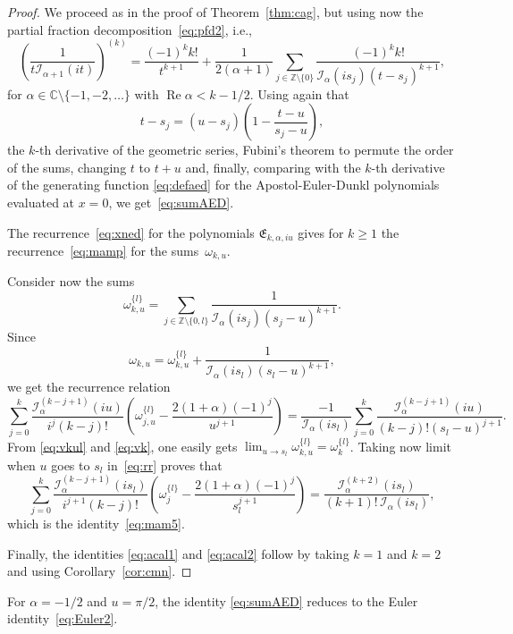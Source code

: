 \documentclass[10pt,a4paper]{article}
\theoremstyle{plain}
\theoremstyle{definition}
\numberwithin{equation}{section} %
\newcommand{\I}{\mathcal{I}}
\newcommand{\E}{\mathfrak{E}}
\newcommand{\ZZ}{\mathbb{Z}}
\newcommand{\CC}{\mathbb{C}}
\newcommand{\ZZO}{\mathbb{Z} \setminus \{0\}}
\renewcommand{\Re}{\operatorname{Re}}
\begin{document}
\begin{proof}
We proceed as in the proof of Theorem~\ref{thm:cag}, but using now the partial fraction decomposition~\eqref{eq:pfd2}, i.e.,
\begin{equation*}
  \left(\frac{1}{t\I_{\alpha+1}(it)}\right)^{(k)}
  = \frac{(-1)^kk!}{t^{k+1}} + \frac{1}{2(\alpha+1)} \sum_{j\in\ZZO}
  \frac{(-1)^kk!}{\I_\alpha(is_j)(t-s_j)^{k+1}},
\end{equation*}
for $\alpha\in \CC\setminus\{-1,-2,\dots\}$ with $\Re \alpha < k-1/2$.
Using again that
\[
  t-s_j = (u-s_j)\left(1-\frac{t-u}{s_j-u}\right),
\]
the $k$-th derivative of the geometric series, Fubini's theorem to permute the order of the sums, changing $t$ to $t+u$ and, finally, comparing with the $k$-th derivative of the generating function \eqref{eq:defaed} for the Apostol-Euler-Dunkl polynomials evaluated at $x=0$, we get~\eqref{eq:sumAED}.

The recurrence~\eqref{eq:xned} for the polynomials $\E_{k,\alpha,iu}$ gives for $k\ge 1$ the recurrence~\eqref{eq:mamp} for the sums~$\omega_{k,u}$.

Consider now the sums
\begin{equation}
\label{eq:vkul}
  \omega_{k,u}^{\{l\}} = \sum_{j\in \ZZ\setminus \{0,l\}} \frac{1}{\I_\alpha(is_j)(s_j-u)^{k+1}}.
\end{equation}
Since
\[
  \omega_{k,u} = \omega_{k,u}^{\{l\}} + \frac{1}{\I_\alpha(is_l)(s_l-u)^{k+1}},
\]
we get the recurrence relation
\begin{equation}
\label{eq:rr}
  \sum_{j=0}^k \frac{\I_\alpha^{(k-j+1)}(iu)}{i^j(k-j)!}
  \left(\omega_{j,u}^{\{l\}}-\frac{2(1+\alpha)(-1)^j}{u^{j+1}}\right)
  = \frac{-1}{\I_\alpha(is_l)} \sum_{j=0}^k \frac{\I_\alpha^{(k-j+1)}(iu)}{(k-j)!(s_l-u)^{j+1}}.
\end{equation}
From \eqref{eq:vkul} and \eqref{eq:vk}, one easily gets $\lim_{u\to s_l} \omega_{k,u}^{\{l\}} = \omega_k^{\{l\}}$.
Taking now limit when $u$ goes to $s_l$ in~\eqref{eq:rr} proves that
\[
  \sum_{j=0}^k \frac{\I_\alpha^{(k-j+1)}(is_l)}{i^{j+1}(k-j)!}
  \left(\omega_j^{\{l\}}-\frac{2(1+\alpha)(-1)^j}{s_l^{j+1}}\right)
  = \frac{\I_\alpha^{(k+2)}(is_l)}{(k+1)!\,\I_\alpha(is_l)},
\]
which is the identity~\eqref{eq:mam5}.

Finally, the identities \eqref{eq:acal1} and \eqref{eq:acal2} follow by taking $k=1$ and $k=2$ and using Corollary~\ref{cor:cmn}.
\end{proof}

For $\alpha=-1/2$ and $u=\pi/2$, the identity \eqref{eq:sumAED} reduces to the Euler identity~\eqref{eq:Euler2}.
\end{document}
